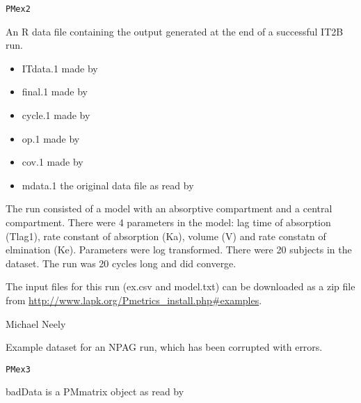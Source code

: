 \documentclass[a4paper]{book}
\begin{document}
%
\begin{Usage}
\begin{verbatim}
PMex2
\end{verbatim}
\end{Usage}
%
\begin{Format}
An R data file containing the output generated at the end of a successful IT2B run.
\begin{itemize}

\item{} ITdata.1 made by 
\item{} final.1 made by  
\item{} cycle.1 made by 
\item{} op.1 made by 
\item{} cov.1 made by 
\item{} mdata.1 the original data file as read by 

\end{itemize}
\end{Format}
%
\begin{Details}\relax
The run consisted of a model with an absorptive compartment and a central compartment.
There were 4 parameters in the model: lag time of absorption (Tlag1),
rate constant of absorption (Ka), volume (V) and rate constatn of elmination (Ke).
Parameters were log transformed.  There were 20 subjects in the dataset.  The run was
20 cycles long and did converge.

The input files for this run (ex.csv and model.txt) can be downloaded as a zip file from 
\url{http://www.lapk.org/Pmetrics_install.php#examples}.
\end{Details}
%
\begin{Author}\relax
Michael Neely
\end{Author}
%
\begin{Description}\relax
Example dataset for an NPAG run, which has been corrupted with errors.
\end{Description}
%
\begin{Usage}
\begin{verbatim}
PMex3
\end{verbatim}
\end{Usage}
%
\begin{Format}
badData is a PMmatrix object as read by 
\end{Format}
\end{document}
